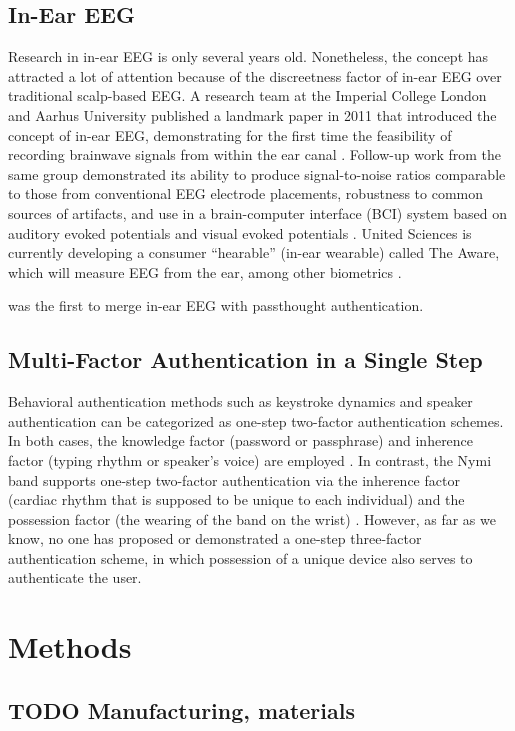 \documentclass[letterpaper,twocolumn,10pt]{article}
\begin{document}
\subsection{In-Ear EEG}
Research in in-ear EEG is only several years old. Nonetheless, the concept has
attracted a lot of attention because of the discreetness factor of in-ear EEG over
traditional scalp-based EEG. A research team at the Imperial College London
and Aarhus University published a landmark paper in 2011 that introduced the
concept of in-ear EEG, demonstrating for the first time the feasibility of recording
brainwave signals from within the ear canal
\cite{Looney2011}.
Follow-up work from the same
group demonstrated its ability to produce signal-to-noise ratios comparable to
those from conventional EEG electrode placements, robustness to common
sources of artifacts, and use in a brain-computer interface (BCI) system based on
auditory evoked potentials and visual evoked potentials
\cite{Looney2012a,Kidmose2013a,Kidmose2013b}.
United Sciences is currently developing a consumer ``hearable'' (in-ear wearable) called The Aware, which will measure EEG from the ear, among other biometrics \cite{UnitedSciences}.


\cite{curranpassthoughts} was the first to merge in-ear EEG with passthought authentication.

\subsection{Multi-Factor Authentication in a Single Step}
Behavioral authentication methods such as keystroke dynamics and speaker
authentication can be categorized as one-step two-factor authentication
schemes. In both cases, the knowledge factor (password or passphrase) and
inherence factor (typing rhythm or speaker’s voice) are employed \cite{Monrose1997}.
In contrast, the Nymi band supports one-step two-factor authentication via the inherence
factor (cardiac rhythm that is supposed to be unique to each individual) and the
possession factor (the wearing of the band on the wrist) \cite{Nymi}.
However, as far as we know, no one has proposed or demonstrated a one-step three-factor
authentication scheme, in which possession of a unique device also serves to authenticate the user.

\section{Methods}
\label{sec:org63d105c}
\subsection{{\bfseries\sffamily TODO} Manufacturing, materials}
\label{sec:orgb483219}
\end{document}

